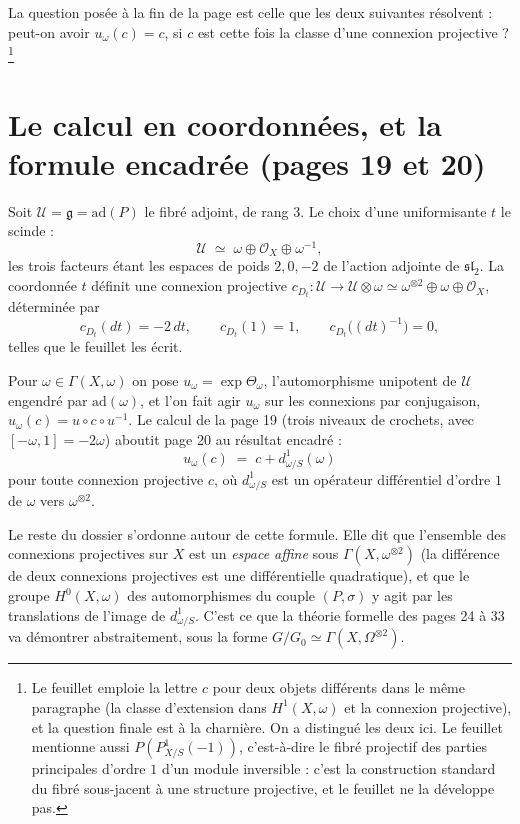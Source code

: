 \documentclass[11pt,a4paper]{article}
\begin{document}
La question posée à la fin de la page est celle que les deux suivantes
résolvent : peut-on avoir $u_\omega(c) = c$, si $c$ est cette fois la classe
d'une connexion projective ?\footnote{Le feuillet emploie la lettre $c$ pour
deux objets différents dans le même paragraphe (la classe d'extension dans
$H^1(X,\omega)$ et la connexion projective), et la question finale est
à la charnière. On a distingué les deux ici. Le feuillet mentionne
aussi $P(P^1_{X/S}(-1))$, c'est-à-dire le fibré projectif des parties
principales d'ordre $1$ d'un module inversible : c'est la construction
standard du fibré sous-jacent à une structure projective, et le feuillet ne
la développe pas.}

\section*{Le calcul en coordonnées, et la formule encadrée (pages 19 et 20)}

Soit $\mathcal{U} = \mathfrak{g} = \mathrm{ad}(P)$ le fibré adjoint, de rang
$3$. Le choix d'une uniformisante $t$ le scinde :
\[
  \mathcal{U} \;\simeq\; \omega \oplus \mathcal{O}_X \oplus \omega^{-1},
\]
les trois facteurs étant les espaces de poids $2, 0, -2$ de l'action adjointe
de $\mathfrak{sl}_2$. La coordonnée $t$ définit une connexion projective
$c_{D_t} : \mathcal{U} \to \mathcal{U} \otimes \omega \simeq
\omega^{\otimes 2} \oplus \omega \oplus \mathcal{O}_X$, déterminée par
\[
  c_{D_t}(dt) = -2\,dt, \qquad c_{D_t}(1) = 1, \qquad
  c_{D_t}\big((dt)^{-1}\big) = 0,
\]
telles que le feuillet les écrit.

Pour $\omega \in \Gamma(X, \omega)$ on pose $u_\omega = \exp \Theta_\omega$,
l'automorphisme unipotent de $\mathcal{U}$ engendré par $\mathrm{ad}(\omega)$,
et l'on fait agir $u_\omega$ sur les connexions par conjugaison,
$u_\omega(c) = u \circ c \circ u^{-1}$. Le calcul de la page 19 (trois
niveaux de crochets, avec $[-\omega, 1] = -2\omega$) aboutit page 20 au
résultat encadré :
\[
  \boxed{\;u_\omega(c) \;=\; c + d^1_{\omega/S}(\omega)\;}
\]
pour toute connexion projective $c$, où $d^1_{\omega/S}$ est un opérateur
différentiel d'ordre $1$ de $\omega$ vers $\omega^{\otimes 2}$.

Le reste du dossier s'ordonne autour de cette formule. Elle dit que
l'ensemble des connexions projectives sur $X$ est un \emph{espace affine} sous
$\Gamma(X, \omega^{\otimes 2})$ (la différence de deux connexions projectives
est une différentielle quadratique), et que le groupe $H^0(X, \omega)$ des
automorphismes du couple $(P,\sigma)$ y agit par les translations de l'image
de $d^1_{\omega/S}$. C'est ce que la théorie formelle des
pages 24 à 33 va démontrer abstraitement, sous la forme
$G/G_0 \simeq \Gamma(X, \Omega^{\otimes 2})$.
\end{document}
